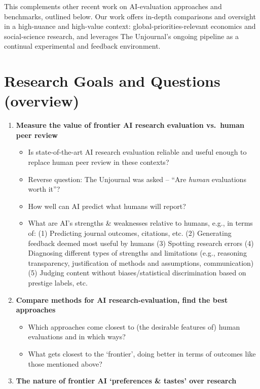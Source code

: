 \documentclass[
  11pt,
  letterpaper,
  DIV=11,
  numbers=noendperiod]{scrreprt}
\providecommand{\tightlist}{%
  \setlength{\itemsep}{0pt}\setlength{\parskip}{0pt}}
\begin{document}
This complements other recent work on AI-evaluation approaches and
benchmarks, outlined below. Our work offers in-depth comparisons and
oversight in a high-nuance and high-value context:
global-priorities-relevant economics and social-science research, and
leverages The Unjournal's ongoing pipeline as a continual experimental
and feedback environment.

\section{Research Goals and Questions
(overview)}\label{research-goals-and-questions-overview}

\begin{enumerate}
\def\labelenumi{\arabic{enumi}.}
\tightlist
\item
  \textbf{Measure the value of frontier AI research evaluation vs.~human
  peer review}

  \begin{itemize}
  \tightlist
  \item
    Is state-of-the-art AI research evaluation reliable and useful
    enough to replace human peer review in these contexts?
  \item
    Reverse question: The Unjournal was asked -- ``Are \emph{human}
    evaluations worth it''?
  \item
    How well can AI predict what humans will report?
  \item
    What are AI's strengths \& weaknesses relative to humans, e.g., in
    terms of: (1) Predicting journal outcomes, citations, etc. (2)
    Generating feedback deemed most useful by humans (3) Spotting
    research errors (4) Diagnosing different types of strengths and
    limitations (e.g., reasoning transparency, justification of methods
    and assumptions, communication) (5) Judging content without
    biases/statistical discrimination based on prestige labels, etc.
  \end{itemize}
\item
  \textbf{Compare methods for AI research-evaluation, find the best
  approaches}

  \begin{itemize}
  \tightlist
  \item
    Which approaches come closest to (the desirable features of) human
    evaluations and in which ways?
  \item
    What gets closest to the `frontier', doing better in terms of
    outcomes like those mentioned above?
  \end{itemize}
\item
  \textbf{The nature of frontier AI `preferences \& tastes' over
  research}


\end{enumerate}
\end{document}
